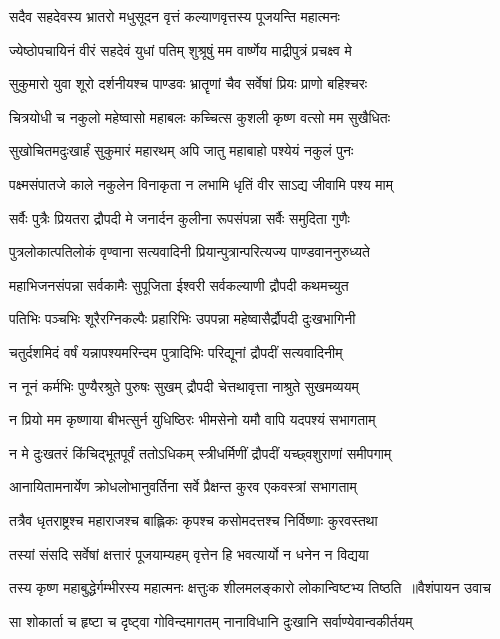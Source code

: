 \twolineshloka
{सदैव सहदेवस्य भ्रातरो मधुसूदन}
{वृत्तं कल्याणवृत्तस्य पूजयन्ति महात्मनः}


\twolineshloka
{ज्येष्ठोपचायिनं वीरं सहदेवं युधां पतिम्}
{शुश्रूषुं मम वार्ष्णेय माद्रीपुत्रं प्रचक्ष्व मे}


\twolineshloka
{सुकुमारो युवा शूरो दर्शनीयश्च पाण्डवः}
{भ्रातॄणां चैव सर्वेषां प्रियः प्राणो बहिश्चरः}


\twolineshloka
{चित्रयोधी च नकुलो महेष्वासो महाबलः}
{कच्चित्स कुशली कृष्ण वत्सो मम सुखैधितः}


\twolineshloka
{सुखोचितमदुःखार्हं सुकुमारं महारथम्}
{अपि जातु महाबाहो पश्येयं नकुलं पुनः}


\twolineshloka
{पक्ष्मसंपातजे काले नकुलेन विनाकृता}
{न लभामि धृतिं वीर साऽद्य जीवामि पश्य माम्}


\twolineshloka
{सर्वैः पुत्रैः प्रियतरा द्रौपदी मे जनार्दन}
{कुलीना रूपसंपन्ना सर्वैः समुदिता गुणैः}


\twolineshloka
{पुत्रलोकात्पतिलोकं वृण्वाना सत्यवादिनी}
{प्रियान्पुत्रान्परित्यज्य पाण्डवाननुरुध्यते}


\twolineshloka
{महाभिजनसंपन्ना सर्वकामैः सुपूजिता}
{ईश्वरी सर्वकल्याणी द्रौपदी कथमच्युत}


\twolineshloka
{पतिभिः पञ्चभिः शूरैरग्निकल्पैः प्रहारिभिः}
{उपपन्ना महेष्वासैर्द्रौपदी दुःखभागिनी}


\twolineshloka
{चतुर्दशमिदं वर्षं यन्नापश्यमरिन्दम}
{पुत्रादिभिः परिद्यूनां द्रौपदीं सत्यवादिनीम्}


\twolineshloka
{न नूनं कर्मभिः पुण्यैरश्रुते पुरुषः सुखम्}
{द्रौपदी चेत्तथावृत्ता नाश्रुते सुखमव्ययम्}


\twolineshloka
{न प्रियो मम कृष्णाया बीभत्सुर्न युधिष्ठिरः}
{भीमसेनो यमौ वापि यदपश्यं सभागताम्}


\twolineshloka
{न मे दुःखतरं किंचिद्भूतपूर्वं ततोऽधिकम्}
{स्त्रीधर्मिणीं द्रौपदीं यच्छ्वशुराणां समीपगाम्}


\twolineshloka
{आनायितामनार्येण क्रोधलोभानुवर्तिना}
{सर्वे प्रैक्षन्त कुरव एकवस्त्रां सभागताम्}


\twolineshloka
{तत्रैव धृतराष्ट्रश्च महाराजश्च बाह्लिकः}
{कृपश्च कसोमदत्तश्च निर्विष्णाः कुरवस्तथा}


\twolineshloka
{तस्यां संसदि सर्वेषां क्षत्तारं पूजयाम्यहम्}
{वृत्तेन हि भवत्यार्यो न धनेन न विद्यया}


\threelineshloka
{तस्य कृष्ण महाबुद्धेर्गम्भीरस्य महात्मनः}
{क्षत्तुःक शीलमलङ्कारो लोकान्विष्टभ्य तिष्ठति ॥वैशंपायन उवाच}
{}


\twolineshloka
{सा शोकार्ता च हृष्टा च दृष्ट्वा गोविन्दमागतम्}
{नानाविधानि दुःखानि सर्वाण्येवान्वकीर्तयम्}


